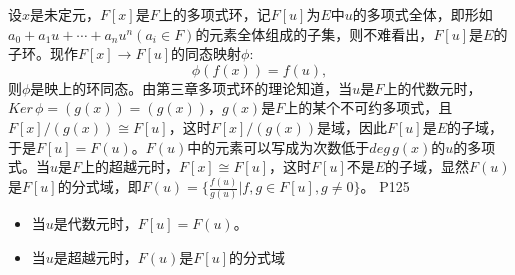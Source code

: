 \original
{
	设$x$是未定元，$F[x]$是$F$上的多项式环，记$F[u]$为$E$中$u$的多项式全体，即形如$a_{0}+a_{1}u+\cdots+a_{n}u^{n}(a_{i}\in F)$的元素全体组成的子集，则不难看出，$F[u]$是$E$的子环。现作$F[x]\rightarrow F[u]$的同态映射$\phi$:
	\begin{equation*}
		\phi(f(x))=f(u),
	\end{equation*}
	则$\phi$是映上的环同态。由第三章多项式环的理论知道，当$u$是$F$上的代数元时，$Ker\,\phi=(g(x))=(g(x))$，$g(x)$是$F$上的某个不可约多项式，且$F[x]/(g(x))\cong F[u]$，这时$F[x]/(g(x))$是域，因此$F[u]$是$E$的子域，于是$F[u]=F(u)$。$F(u)$中的元素可以写成为次数低于$deg\, g(x)$的$u$的多项式。当$u$是$F$上的超越元时，$F[x]\cong F[u]$，这时$F[u]$不是$E$的子域，显然$F(u)$是$F[u]$的分式域，即$F(u)=\{\frac{f(u)}{g(u)}\big| f,g\in F[u],g\neq 0\}$。
}
{P125}

\begin{proposition}
	\begin{itemize}
		\item 当$u$是代数元时，$F[u]=F(u)$。
		\item 当$u$是超越元时，$F(u)$是$F[u]$的分式域
	\end{itemize}
\end{proposition}




